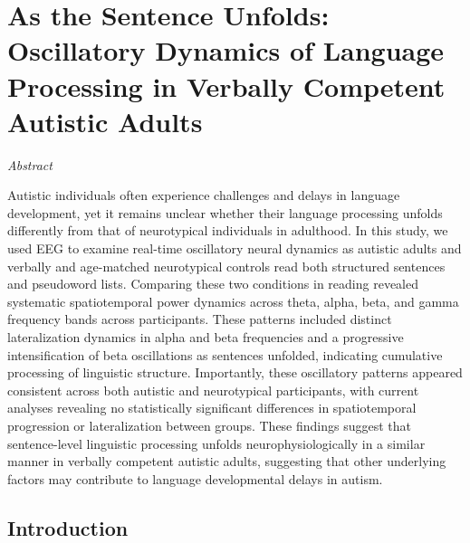 \chapter{As the Sentence Unfolds: Oscillatory Dynamics of Language Processing in Verbally Competent Autistic Adults}
\label{ch:language_asc}

\begin{center}
    \large\textit{Abstract}
\end{center} 

{\abstractfont 
Autistic individuals often experience challenges and delays in language development, yet it remains unclear whether their language processing unfolds differently from that of neurotypical individuals in adulthood. In this study, we used EEG to examine real-time oscillatory neural dynamics as autistic adults and verbally and age-matched neurotypical controls read both structured sentences and pseudoword lists. Comparing these two conditions in reading revealed systematic spatiotemporal power dynamics across theta, alpha, beta, and gamma frequency bands across participants. These patterns included distinct lateralization dynamics in alpha and beta frequencies and a progressive intensification of beta oscillations as sentences unfolded, indicating cumulative processing of linguistic structure. Importantly, these oscillatory patterns appeared consistent across both autistic and neurotypical participants, with current analyses revealing no statistically significant differences in spatiotemporal progression or lateralization between groups. These findings suggest that sentence-level linguistic processing unfolds neurophysiologically in a similar manner in verbally competent autistic adults, suggesting that other underlying factors may contribute to language developmental delays in autism. \par
} 

\vspace{2cm}

\thispagestyle{empty}

\newpage

\section{Introduction}

